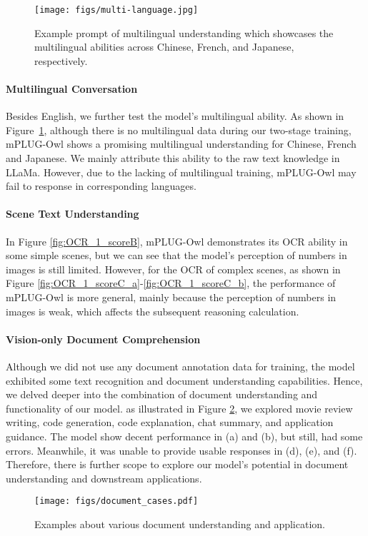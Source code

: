 \documentclass{article}
\newcommand{\modelname}{mPLUG-Owl\xspace}
\begin{document}
\begin{figure}[!ht]
    \centering
    \texttt{[image: figs/multi-language.jpg]}
    \caption{Example prompt of multilingual understanding which showcases the multilingual abilities across Chinese, French, and Japanese, respectively.}
    \label{fig:multilingual}
    \vspace{-2mm}
\end{figure}

\paragraph{Multilingual Conversation}
Besides English, we further test the model's multilingual ability. As shown in Figure~\ref{fig:multilingual}, although there is no multilingual data during our two-stage training, \modelname shows a promising multilingual understanding for Chinese, French and Japanese. We mainly attribute this ability to the raw text knowledge in LLaMa\citep{llama}. However, due to the lacking of  multilingual training, \modelname may fail to response in corresponding languages. 


\paragraph{Scene Text Understanding}
In Figure \ref{fig:OCR_1_scoreB}, mPLUG-Owl demonstrates its OCR ability in some simple scenes, but we can see that the model's perception of numbers in images is still limited.
However, for the OCR of complex scenes, as shown in Figure \ref{fig:OCR_1_scoreC_a}-\ref{fig:OCR_1_scoreC_b}, the performance of mPLUG-Owl is more general, mainly because the perception of numbers in images is weak, which affects the subsequent reasoning calculation.

\paragraph{Vision-only Document Comprehension}
Although we did not use any document annotation data for training, the model exhibited some text recognition and document understanding capabilities. Hence, we delved deeper into the combination of document understanding and functionality of our model. as illustrated in Figure \ref{fig:document_app}, we explored movie review writing, code generation, code explanation, chat summary, and application guidance. The model show decent performance in (a) and (b), but still, had some errors. Meanwhile, it was unable to provide usable responses in (d), (e), and (f). Therefore, there is further scope to explore our model's potential in document understanding and downstream applications.
\begin{figure}[!ht]
    \centering
    \texttt{[image: figs/document\_cases.pdf]}
    \caption{Examples about various document understanding and application.}
    \label{fig:document_app}
    \vspace{-2mm}
\end{figure}
\end{document}
